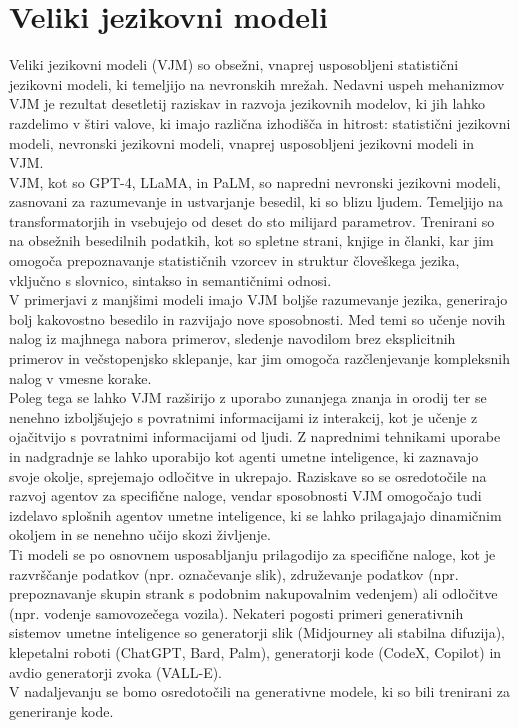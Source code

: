 \documentclass[a4paper,12pt,openright]{book}
\begin{document}
\section{Veliki jezikovni modeli}
Veliki jezikovni modeli (VJM) so obsežni, vnaprej usposobljeni statistični jezikovni modeli, ki temeljijo na nevronskih mrežah. Nedavni uspeh mehanizmov VJM je rezultat desetletij raziskav in razvoja jezikovnih modelov, ki jih lahko razdelimo v štiri valove, ki imajo različna izhodišča in hitrost: statistični jezikovni modeli, nevronski jezikovni modeli, vnaprej usposobljeni jezikovni modeli in VJM.\cite{minaee2024largelanguagemodelssurvey} \\
VJM, kot so GPT-4, LLaMA, in PaLM, so napredni nevronski jezikovni modeli, zasnovani za razumevanje in ustvarjanje besedil, ki so blizu ljudem. Temeljijo na transformatorjih in vsebujejo od deset do sto milijard parametrov. Trenirani so na obsežnih besedilnih podatkih, kot so spletne strani, knjige in članki, kar jim omogoča prepoznavanje statističnih vzorcev in struktur človeškega jezika, vključno s slovnico, sintakso in semantičnimi odnosi.\cite{10.1145/3520312.3534862} \\
V primerjavi z manjšimi modeli imajo VJM boljše razumevanje jezika, generirajo bolj kakovostno besedilo in razvijajo nove sposobnosti. Med temi so učenje novih nalog iz majhnega nabora primerov, sledenje navodilom brez eksplicitnih primerov in večstopenjsko sklepanje, kar jim omogoča razčlenjevanje kompleksnih nalog v vmesne korake. \\
Poleg tega se lahko VJM razširijo z uporabo zunanjega znanja in orodij ter se nenehno izboljšujejo s povratnimi informacijami iz interakcij, kot je učenje z ojačitvijo s povratnimi informacijami od ljudi. Z naprednimi tehnikami uporabe in nadgradnje se lahko uporabijo kot agenti umetne inteligence, ki zaznavajo svoje okolje, sprejemajo odločitve in ukrepajo. Raziskave so se osredotočile na razvoj agentov za specifične naloge, vendar sposobnosti VJM omogočajo tudi izdelavo splošnih agentov umetne inteligence, ki se lahko prilagajajo dinamičnim okoljem in se nenehno učijo skozi življenje.
\cite{minaee2024largelanguagemodelssurvey} \\
Ti modeli se po osnovnem usposabljanju prilagodijo za specifične naloge, kot je razvrščanje podatkov (npr. označevanje slik), združevanje podatkov (npr. prepoznavanje skupin strank s podobnim nakupovalnim vedenjem) ali
odločitve (npr. vodenje samovozečega vozila). Nekateri pogosti primeri generativnih sistemov umetne inteligence so generatorji slik
(Midjourney ali stabilna difuzija), klepetalni roboti (ChatGPT, Bard,
Palm), generatorji kode (CodeX, Copilot) in avdio
generatorji zvoka (VALL-E). \cite{Hadi_2023} \\
V nadaljevanju se bomo osredotočili na generativne modele, ki so bili trenirani za generiranje kode.
\end{document}
